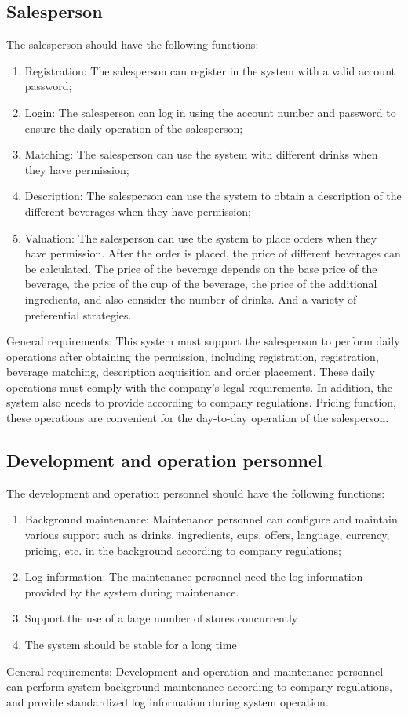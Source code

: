 \documentclass[a4paper]{report}
\begin{document}
\subsection{Salesperson}
The salesperson should have the following functions:
\begin{enumerate}
\item
Registration: The salesperson can register in the system with a valid account password;
\item
Login: The salesperson can log in using the account number and password to ensure the daily operation of the salesperson;
\item
Matching: The salesperson can use the system with different drinks when they have permission;
\item
Description: The salesperson can use the system to obtain a description of the different beverages when they have permission;
\item
Valuation: The salesperson can use the system to place orders when they have permission. After the order is placed, the price of different beverages can be calculated. The price of the beverage depends on the base price of the beverage, the price of the cup of the beverage, the price of the additional ingredients, and also consider the number of drinks. And a variety of preferential strategies.
\end{enumerate}
\par
General requirements: This system must support the salesperson to perform daily operations after obtaining the permission, including registration, registration, beverage matching, description acquisition and order placement. These daily operations must comply with the company's legal requirements. In addition, the system also needs to provide according to company regulations. Pricing function, these operations are convenient for the day-to-day operation of the salesperson.
\subsection{Development and operation personnel}
The development and operation personnel should have the following functions:
\begin{enumerate}
\item
Background maintenance: Maintenance personnel can configure and maintain various support such as drinks, ingredients, cups, offers, language, currency, pricing, etc. in the background according to company regulations;
\item
Log information: The maintenance personnel need the log information provided by the system during maintenance.
\item
Support the use of a large number of stores concurrently 
\item 
The system should be stable for a long time
\end{enumerate}
General requirements: Development and operation and maintenance personnel can perform system background maintenance according to company regulations, and provide standardized log information during system operation.
\end{document}
